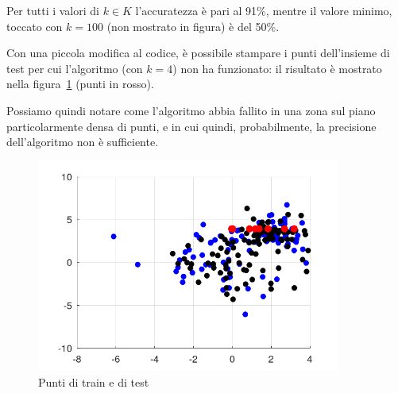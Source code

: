 \documentclass[a4paper]{article}
\begin{document}
Per tutti i valori di $k\in K$ l'accuratezza è pari al 91\%, mentre il valore minimo, toccato con $k=100$ (non mostrato in figura) è del 50\%.

Con una piccola modifica al codice, è possibile stampare i punti dell'insieme di test per cui l'algoritmo (con $k=4$) non ha funzionato: il risultato è mostrato nella figura~\ref{fig:sb} (punti in rosso).

Possiamo quindi notare come l'algoritmo abbia fallito in una zona sul piano particolarmente densa di punti, e in cui quindi, probabilmente, la precisione dell'algoritmo non è sufficiente.

\begin{figure}
\centering
\label{fig:sb}
\includegraphics[width=10cm]{puntisb}
\caption{Punti di train e di test}
\end{figure}
\end{document}
